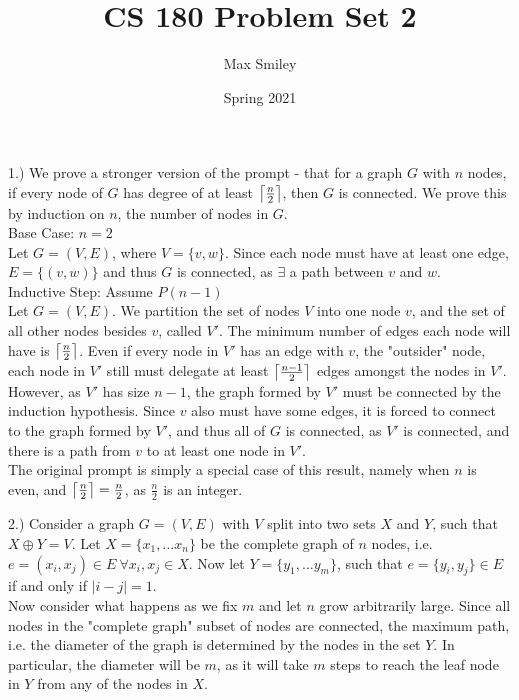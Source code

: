 \documentclass[12pt]{article}
\DeclarePairedDelimiter{\ceil}{\lceil}{\rceil}
\begin{document}
\title{CS 180 Problem Set 2}
\author{Max Smiley}
\date{Spring 2021}
\maketitle

1.) We prove a stronger version of the prompt - that for a graph $G$ with $n$ nodes, if every node of $G$ has degree of at least $\ceil*{\frac{n}{2}}$, then $G$ is connected. We prove this by induction on $n$, the number of nodes in $G$.\\

Base Case: $n = 2$\\
Let $G = (V, E)$, where $V = \{ v, w \}$. Since each node must have at least one edge, $E = \{ (v, w)\}$ and thus $G$ is connected, as $\exists$ a path between $v$ and $w$.\\

Inductive Step: Assume $P(n - 1)$\\
Let $G = (V, E)$. We partition the set of nodes $V$ into one node $v$, and the set of all other nodes besides $v$, called $V'$. The minimum number of edges each node will have is $\ceil*{\frac{n}{2}}$. Even if every node in $V'$ has an edge with $v$, the "outsider" node, each node in $V'$ still must delegate at least $\ceil*{\frac{n - 1}{2}}$ edges amongst the nodes in $V'$. However, as $V'$ has size $n - 1$, the graph formed by $V'$ must be connected by the induction hypothesis. Since $v$ also must have some edges, it is forced to connect to the graph formed by $V'$, and thus all of $G$ is connected, as $V'$ is connected, and there is a path from $v$ to at least one node in $V'$.\\

The original prompt is simply a special case of this result, namely when $n$ is even, and $\ceil*{\frac{n}{2}} = \frac{n}{2}$, as $\frac{n}{2}$ is an integer.

\pagebreak

2.) Consider a graph $G = (V, E)$ with $V$ split into two sets $X$ and $Y$, such that $X \oplus Y = V$. Let $X = \{ x_1, \dots x_n \}$ be the complete graph of $n$ nodes, i.e. $e = (x_i, x_j) \in E\ \forall x_i, x_j \in X$. Now let $Y = \{ y_1, \dots y_m \}$, such that $e = \{ y_i, y_j\} \in E$ if and only if $| i - j | = 1$.\\

Now consider what happens as we fix $m$ and let $n$ grow arbitrarily large. Since all nodes in the "complete graph" subset of nodes are connected, the maximum path, i.e. the diameter of the graph is determined by the nodes in the set $Y$. In particular, the diameter will be $m$, as it will take $m$ steps to reach the leaf node in $Y$ from any of the nodes in $X$.\\
\end{document}
